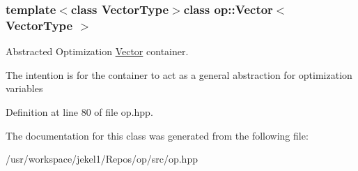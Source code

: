 \subsubsection*{template$<$class Vector\-Type$>$class op\-::\-Vector$<$ Vector\-Type $>$}

Abstracted Optimization \hyperlink{classop_1_1Vector}{Vector} container. 

The intention is for the container to act as a general abstraction for optimization variables 

Definition at line 80 of file op.\-hpp.



The documentation for this class was generated from the following file\-:\begin{DoxyCompactItemize}
\item 
/usr/workspace/jekel1/\-Repos/op/src/op.\-hpp\end{DoxyCompactItemize}
